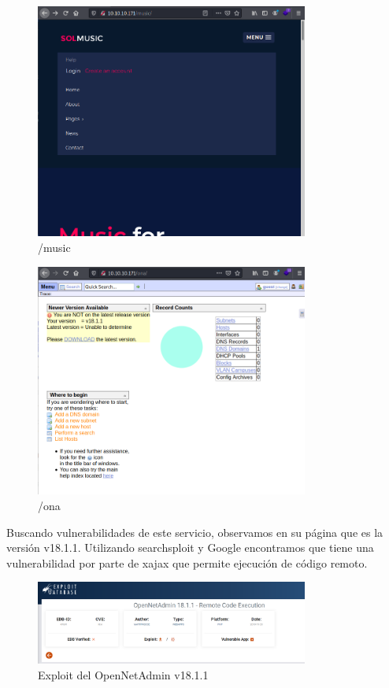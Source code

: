 \documentclass{article}
\begin{document}
\begin{figure}[h]
	\center
	\includegraphics[width=0.8\textwidth]{images/openadmin/4-musicdetalles.png}
	\caption{/music}
\end{figure}

\begin{figure}[h]
	\center
	\includegraphics[width=0.8\textwidth]{images/openadmin/5-ona.png}
	\caption{/ona}
\end{figure}

Buscando vulnerabilidades de este servicio, observamos en su página que es la versión v18.1.1. Utilizando searchsploit y Google encontramos que tiene una vulnerabilidad por parte de xajax que permite ejecución de código remoto.
\begin{figure}[h]
	\center
	\includegraphics[width=0.8\textwidth]{images/openadmin/6-exploit.png}
	\caption{Exploit del OpenNetAdmin v18.1.1}
\end{figure}
\end{document}
